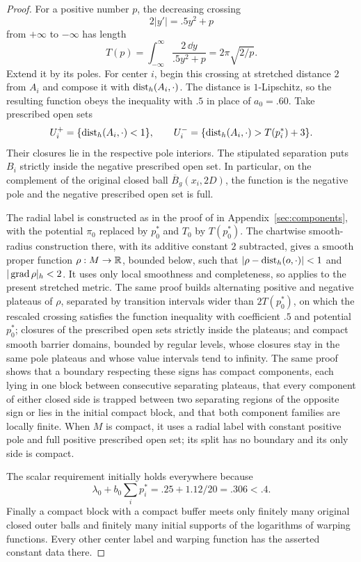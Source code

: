 \begin{proof}
For a positive number $p$, the decreasing crossing
\[
 2|y'|=.5y^2+p
\]
from $+\infty$ to $-\infty$ has length
\[
 T(p)=\int_{-\infty}^{\infty}\frac{2\,\dd y}{.5y^2+p}
      =2\pi\sqrt{2/p}.
\]
Extend it by its poles. For center $i$, begin this crossing at stretched
distance $2$ from $A_i$ and compose it with $\operatorname{dist}_h(A_i,\cdot)$.
The distance is $1$-Lipschitz, so the resulting function obeys the
inequality with $.5$ in place of $a_0=.60$. Take prescribed open sets
\[
 U_i^+=\{\operatorname{dist}_h(A_i,\cdot)<1\},\qquad
 U_i^-=\{\operatorname{dist}_h(A_i,\cdot)>T(p_i^*)+3\}.
\]
Their closures lie in the respective pole interiors. The stipulated
separation puts $B_i$ strictly inside the negative prescribed open set. In particular, on
the complement of the original closed ball $\overline B_g(x_i,2D)$,
the function is the negative pole and the negative prescribed open set is full.

The radial label is constructed as in the proof of
 in Appendix~\ref{sec:components}, with the
potential \(\pi_0\) replaced by \(p_0^*\) and \(T_0\) by \(T(p_0^*)\).
The chartwise smooth-radius construction there, with its
additive constant \(2\) subtracted, gives a smooth proper function
\(\rho:M\to\mathbb R\), bounded below, such that
\(|\rho-\operatorname{dist}_h(o,\cdot)|<1\) and \(|\operatorname{grad}\rho|_h<2\).
It uses only local smoothness and completeness, so applies to the
present stretched metric.
The same proof builds alternating positive and negative plateaus of
\(\rho\), separated by transition intervals wider than \(2T(p_0^*)\),
on which the rescaled crossing satisfies the function inequality with
coefficient \(.5\) and potential \(p_0^*\); closures of the prescribed open sets strictly
inside the plateaus; and compact smooth barrier domains, bounded by
regular levels, whose closures stay in the same pole plateaus and
whose value intervals tend to infinity.
The same proof shows that a boundary respecting these signs has compact
components, each lying in one block between consecutive separating
plateaus, that every component of either closed side is trapped between
two separating regions of the opposite sign or lies in the initial compact
block, and that both component families are locally finite. When \(M\)
is compact, it uses a radial label with constant positive pole and full
positive prescribed open set; its split has no boundary and its only side is compact.

The scalar requirement initially holds everywhere because
\[
 \lambda_0+b_0\sum_i p_i^*=.25+1.12/20=.306<.4.
\]
Finally a compact block with a compact buffer meets only finitely many
original closed outer balls and finitely many initial supports of the logarithms of warping functions.
Every other center label and warping function has the asserted constant data there.
\end{proof}


